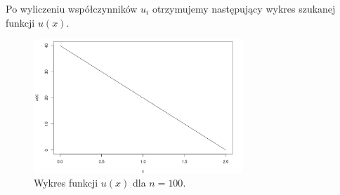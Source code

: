 \documentclass{article}
\begin{document}
Po wyliczeniu współczynników \( u_i \) otrzymujemy następujący wykres szukanej funkcji \( u(x) \).

\begin{figure}[h]
    \centering
    \includegraphics[width=0.7\textwidth]{img/solution.png}
    \caption{Wykres funkcji \( u(x) \) dla \( n = 100 \).}
\end{figure}
\end{document}
